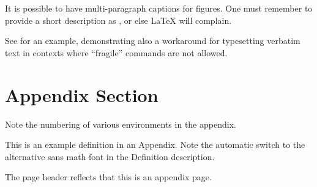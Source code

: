 \clearpage
\begin{example}
    It is possible to have multi-paragraph captions for figures.
    One must remember to provide a short description as , or else \LaTeX{} will complain.

    See  for an example, demonstrating also a workaround for typesetting verbatim text in contexts where \enquote{fragile} commands are not allowed.
\end{example}
%
%

\section{Appendix Section}%
\label{sec:Appendix Section}

Note the numbering of various environments in the appendix.

\begin{definition}
    This is an example definition in an Appendix.
    Note the automatic switch to the alternative sans math font in the Definition description.
\end{definition}

\begin{remark}
    The page header reflects that this is an appendix page.
\end{remark}

